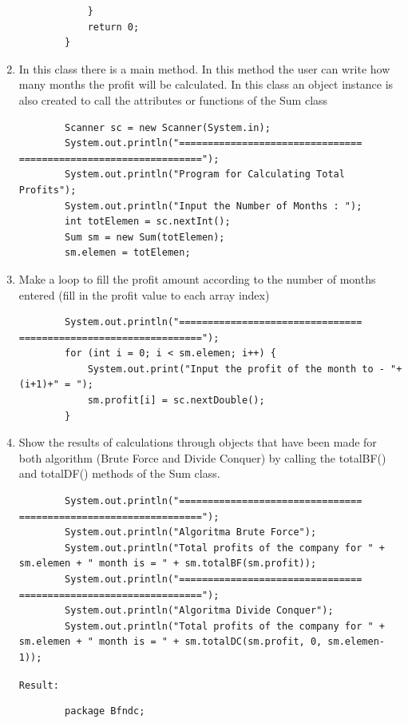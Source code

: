 \documentclass[12pt,titlepage]{article}
\begin{document}
\begin{enumerate}
\begin{verbatim}
            }
            return 0;
        }
    \end{verbatim}
    \item In this class there is a main method. In this method the user can write how many months the profit will be calculated. In this class an object instance is also created to call the attributes or functions of the Sum class
    \begin{verbatim}
        Scanner sc = new Scanner(System.in);
        System.out.println("================================ ================================");
        System.out.println("Program for Calculating Total Profits");
        System.out.println("Input the Number of Months : ");
        int totElemen = sc.nextInt();
        Sum sm = new Sum(totElemen);
        sm.elemen = totElemen;
    \end{verbatim}
    \item Make a loop to fill the profit amount according to the number of months entered (fill in the profit value to each array index)
    \begin{verbatim}
        System.out.println("================================ ================================");
        for (int i = 0; i < sm.elemen; i++) {
            System.out.print("Input the profit of the month to - "+(i+1)+" = ");
            sm.profit[i] = sc.nextDouble();
        }
    \end{verbatim}
    \item Show the results of calculations through objects that have been made for both algorithm (Brute Force and Divide Conquer) by calling the totalBF() and totalDF() methods of the Sum class.
    \begin{verbatim}
        System.out.println("================================ ================================");
        System.out.println("Algoritma Brute Force");
        System.out.println("Total profits of the company for " + sm.elemen + " month is = " + sm.totalBF(sm.profit));
        System.out.println("================================ ================================");
        System.out.println("Algoritma Divide Conquer");
        System.out.println("Total profits of the company for " + sm.elemen + " month is = " + sm.totalDC(sm.profit, 0, sm.elemen-1));
    \end{verbatim}
    \texttt{Result: }
    \begin{verbatim}
        package Bfndc;


\end{verbatim}
\end{enumerate}
\end{document}
